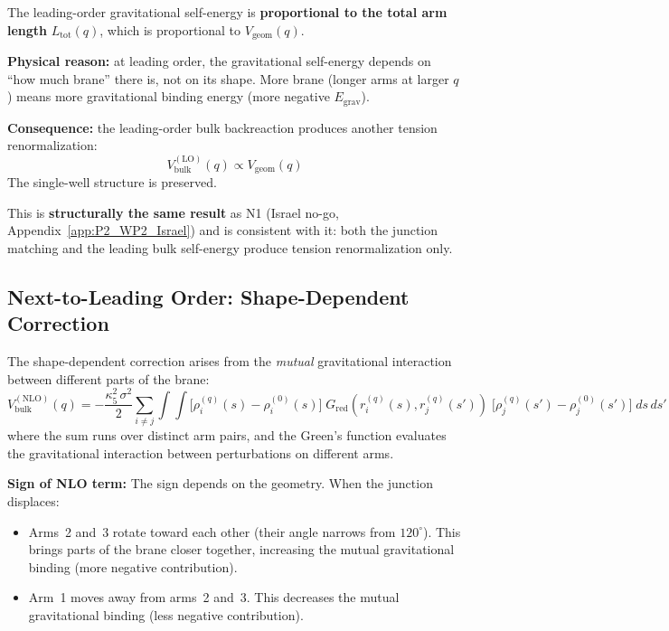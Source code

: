 \begin{resultbox}[title=Leading-Order Structure]
The leading-order gravitational self-energy is \textbf{proportional
to the total arm length} $L_{\mathrm{tot}}(q)$, which is proportional
to $V_{\mathrm{geom}}(q)$.

\textbf{Physical reason:} at leading order, the gravitational
self-energy depends on ``how much brane'' there is, not on its shape.
More brane (longer arms at larger $q$) means more gravitational
binding energy (more negative $E_{\mathrm{grav}}$).

\textbf{Consequence:} the leading-order bulk backreaction produces
another tension renormalization:
\begin{equation}
    V_{\mathrm{bulk}}^{(\mathrm{LO})}(q) \propto V_{\mathrm{geom}}(q)
    \label{eq:N2_LO_prop}
\end{equation}
The single-well structure is preserved. \tagDc

This is \textbf{structurally the same result} as N1 (Israel no-go,
Appendix~\ref{app:P2_WP2_Israel}) and is consistent with it:
both the junction matching and the leading bulk self-energy
produce tension renormalization only.
\end{resultbox}

\subsection{Next-to-Leading Order: Shape-Dependent Correction}
\label{sec:N2:NLO}

The shape-dependent correction arises from the \emph{mutual}
gravitational interaction between different parts of the brane:
\begin{equation}
    V_{\mathrm{bulk}}^{(\mathrm{NLO})}(q) = -\frac{\kappa_5^2\,\sigma^2}{2}
    \sum_{i \neq j}\int\!\!\int
    \bigl[\rho_i^{(q)}(s) - \rho_i^{(0)}(s)\bigr]\;
    G_{\mathrm{red}}(r_i^{(q)}(s), r_j^{(q)}(s'))\;
    \bigl[\rho_j^{(q)}(s') - \rho_j^{(0)}(s')\bigr]\;
    ds\, ds'
    \label{eq:N2_VNLO}
\end{equation}
where the sum runs over distinct arm pairs, and the Green's function
evaluates the gravitational interaction between perturbations on
different arms.

\textbf{Sign of NLO term:} The sign depends on the geometry. When
the junction displaces:
\begin{itemize}
    \item Arms~2 and~3 rotate toward each other (their angle narrows
          from $120^\circ$). This brings parts of the brane closer
          together, increasing the mutual gravitational binding
          (more negative contribution).
    \item Arm~1 moves away from arms~2 and~3. This decreases the
          mutual gravitational binding (less negative contribution).
\end{itemize}

